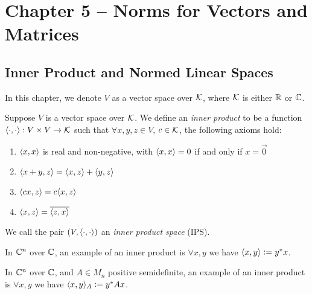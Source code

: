 \section{Chapter 5 -- Norms for Vectors and Matrices}

\subsection{Inner Product and Normed Linear Spaces}

In this chapter, we denote $V$ as a vector space over $\mathcal{K}$, where $\mathcal{K}$ is either $\mathbb R$ or $\mathbb C$.

\begin{definition}
\label{def:inner-product}
Suppose $V$ is a vector space over $\mathcal{K}$. We define an \textit{inner product} to be a function $\langle \cdot, \cdot\rangle : V \times V \rightarrow \mathcal{K}$ such that $\forall x,y,z \in V$, $c \in \mathcal{K}$, the following axioms hold:
\begin{enumerate}[label=(\roman*)]
    \item $\langle x, x\rangle$ is real and non-negative, with $\langle x, x\rangle = 0$ if and only if $x = \Vec{0}$
    \item $\langle x+y, z\rangle = \langle x, z\rangle + \langle y, z\rangle$
    \item $\langle cx, z\rangle = c\langle x, z\rangle$
    \item $\langle x, z\rangle = \overline{\langle z, x\rangle}$
\end{enumerate}
\end{definition}

\begin{definition}
\label{def:inner-product-space}
We call the pair $(V, \langle \cdot, \cdot\rangle)$ an \textit{inner product space} (IPS).
\end{definition}

\begin{example}
In $\mathbb C^n$ over $\mathbb C$, an example of an inner product is $\forall x, y$ we have $\langle x, y\rangle \vcentcolon= y^*x$.
\end{example}

\begin{example}
In $\mathbb C^n$ over $\mathbb C$, and $A \in M_n$ positive semidefinite, an example of an inner product is $\forall x, y$ we have $\langle x, y\rangle_A \vcentcolon= y^*Ax$.
\end{example}


